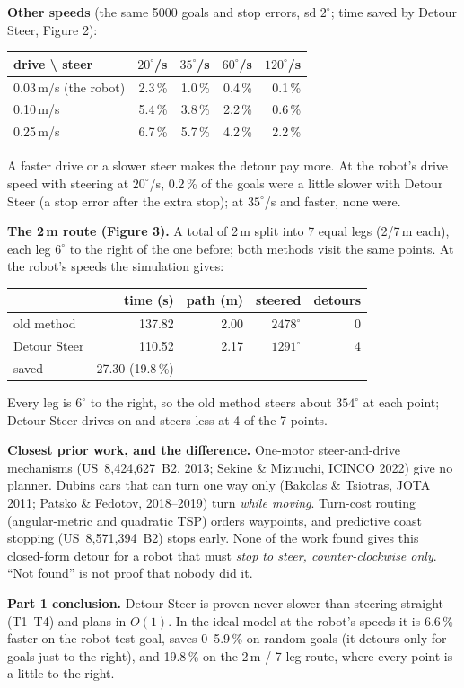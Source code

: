 \documentclass[11pt,a4paper]{article}
\begin{document}
{\smallskip
\noindent\textbf{Other speeds} (the same 5000 goals and stop errors, sd $2^\circ$; time saved by Detour Steer, Figure 2):
\begin{center}
\begin{tabular}{lrrrr}
\toprule
drive \textbackslash{} steer & $20^\circ$/s & $35^\circ$/s & $60^\circ$/s & $120^\circ$/s \\
\midrule
0.03\,m/s (the robot) & 2.3\,\% & 1.0\,\% & 0.4\,\% & 0.1\,\% \\
0.10\,m/s             & 5.4\,\% & 3.8\,\% & 2.2\,\% & 0.6\,\% \\
0.25\,m/s             & 6.7\,\% & 5.7\,\% & 4.2\,\% & 2.2\,\% \\
\bottomrule
\end{tabular}
\end{center}
\noindent A faster drive or a slower steer makes the detour pay more. At the robot's drive speed with steering
at $20^\circ$/s, 0.2\,\% of the goals were a little slower with Detour Steer (a stop error after the extra
stop); at $35^\circ$/s and faster, none were.

\smallskip
\noindent\textbf{The 2\,m route (Figure 3).} A total of 2\,m split into 7 equal legs (2/7\,m each), each leg
$6^\circ$ to the right of the one before; both methods visit the same points.
At the robot's speeds the simulation gives:
\begin{center}
\begin{tabular}{lrrrr}
\toprule
 & time (s) & path (m) & steered & detours \\
\midrule
old method   & 137.82 & 2.00 & $2478^\circ$ & 0 \\
Detour Steer & 110.52 & 2.17 & $1291^\circ$ & 4 \\
\midrule
saved        & 27.30 (19.8\,\%) & & & \\
\bottomrule
\end{tabular}
\end{center}
Every leg is $6^\circ$ to the right, so the old method steers about $354^\circ$ at each point; Detour Steer
drives on and steers less at 4 of the 7 points.

\medskip
\noindent\textbf{Closest prior work, and the difference.}
One-motor steer-and-drive mechanisms (US~8,424,627~B2, 2013; Sekine \& Mizuuchi, ICINCO 2022) give no
planner. Dubins cars that can turn one way only (Bakolas \& Tsiotras, JOTA 2011; Patsko \& Fedotov,
2018--2019) turn \emph{while moving}. Turn-cost routing (angular-metric and quadratic TSP) orders
waypoints, and predictive coast stopping (US~8,571,394~B2) stops early. None of the work found gives this
closed-form detour for a robot that must \emph{stop to steer, counter-clockwise only}. ``Not found'' is not proof
that nobody did it.

\medskip
\noindent\textbf{Part 1 conclusion.} Detour Steer is proven never slower than steering straight (T1--T4)
and plans in $O(1)$. In the ideal model at the robot's speeds it is 6.6\,\% faster on the robot-test goal,
saves 0--5.9\,\% on random goals (it detours only for goals just to the right), and 19.8\,\% on the
2\,m / 7-leg route, where every point is a little to the right.
}
\end{document}
